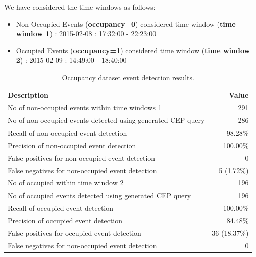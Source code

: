 \documentclass[conference]{IEEEtran}  %
\begin{document}
We have considered the time windows as follows:
\begin{itemize}
\item Non Occupied Events (\textbf{occupancy=0}) considered time window (\textbf{time window 1}) : 2015-02-08 : 17:32:00 - 22:23:00
\item Occupied Events (\textbf{occupancy=1}) considered time window (\textbf{time window 2}) : 2015-02-09 : 14:49:00 - 18:40:00
\end{itemize}

\begin{table}
\begin{center}
\caption{Occupancy dataset event detection results.}
\begin{tabular}{ | m{6cm} | m{2.3cm}| } 
 \hline 
\textbf{Description} & \multicolumn{1}{|r|}{\textbf{Value}}\\
\hline
No of non-occupied events within time windows 1 & \multicolumn{1}{|r|}{291}\\
\hline
No of non-occupied events detected using generated CEP query & \multicolumn{1}{|r|}{286}\\
\hline
Recall of non-occupied event detection & \multicolumn{1}{|r|}{98.28\%}\\
\hline
Precision of non-occupied event detection & \multicolumn{1}{|r|}{100.00\%}\\
\hline
False positives for non-occupied event detection & \multicolumn{1}{|r|}{0}\\
\hline
False negatives for non-occupied event detection & \multicolumn{1}{|r|}{5 (1.72\%)}\\
\hline
No of occupied within time window 2 & \multicolumn{1}{|r|}{196} \\
\hline
No of occupied events detected using generated CEP query & \multicolumn{1}{|r|}{196}\\ 
 \hline
Recall of occupied event detection & \multicolumn{1}{|r|}{100.00\%}\\
\hline
Precision of occupied event detection & \multicolumn{1}{|r|}{84.48\%}\\
\hline
False positives for occupied event detection & \multicolumn{1}{|r|}{36 (18.37\%)}\\
\hline
False negatives for non-occupied event detection & \multicolumn{1}{|r|}{0}\\
\hline

\end{tabular}
\end{center}
\end{table}
\end{document}
